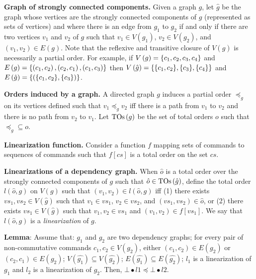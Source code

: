 \textbf{Graph of strongly connected components.} Given a graph $g$, let $\hat{g}$ be the graph whose vertices are the strongly connected components of $g$ (represented as sets of vertices) and where there is an edge from $g_1$ to $g_2$ if and only if there are two vertices $v_1$ and $v_2$ of $g$ such that $v_1 \in V\left( g_1 \right)$, $v_2 \in V\left( g_2 \right)$, and $\left( v_1,v_2 \right)\in E\left( g \right)$. Note that the reflexive and transitive closure of $V\left(  \hat{g} \right)$ is necessarily a partial order. For example, if $V\left( g
\right)=\left\{c_1,c_2,c_3,c_4\right\}$
and $E\left( g \right)=\left\{\left( c_1,c_2 \right),\left( c_2,c_1 \right),\left( c_1,c_3 \right)\right\}$ then $V\left(\hat{g}\right) = \aset{\aset{c_1,c_2},\aset{c_3},\aset{c_4}}$ and $E\left( \hat{g} \right)=\aset{\left( \aset{c_1,c_2},\aset{c_3} \right)}$.

\textbf{Orders induced by a graph.} A directed graph $g$ induces a partial order $\preceq_g$ on its vertices defined such that $v_1 \preceq_g v_2$ iff there is a path from $v_1$ to $v_2$ and there is no path from $v_2$ to $v_1$.
Let $\operatorname{TOs}\left( g \right)$ be the set of total orders $o$ such that $\preceq_g \subseteq o$.

\textbf{Linearization function.} Consider a function $f$ mapping sets of commands to sequences of commands such that $f\left[ cs \right]$ is a total order on the set $cs$.

\textbf{Linearizations of a dependency graph.}
When $\hat{o}$ is a total order over the strongly connected components of $g$ such that $\hat{o} \in \operatorname{TOs}\left( \hat{g} \right)$, define the total order $l\left(\hat{o},g\right)$ on $V\left( g \right)$ such that $\left(v_1,v_2\right) \in l\left(\hat{o},g\right)$ iff (1) there exists $vs_1,vs_2\in V\left(\hat{g}\right)$ such that $v_1\in vs_1$, $v_2\in vs_2$, and $\left( vs_1,vs_2 \right)\in \hat{o}$, or (2) there exists $vs_1\in V\left(\hat{g}\right)$ such that
$v_1,v_2\in  vs_1$ and $\left( v_1,v_2 \right)\in f\left[  vs_1 \right]$.
We say that $l\left(\hat{o},g\right)$ is a \emph{linearization} of $g$.

\textbf{Lemma}: 
Assume that: $g_1$ and $g_2$ are two dependency graphs; 
for every pair of non-commutative commands $c_1,c_2 \in V\left(g_2\right)$, either $\left( c_1,c_2 \right)\in E\left( g_2 \right)$ or $\left( c_2,c_1 \right)\in E\left( g_2 \right)$;
$V\left( \hat{g_1} \right)\subseteq V\left( \hat{g_2} \right)$; 
$E\left( \hat{g_1} \right)\subseteq E\left( \hat{g_2} \right)$; 
$l_1$ is a linearization of $g_1$ and $l_2$ is a linearization of $g_2$. 
Then, $\bot\bullet l1 \preceq \bot\bullet l2$.

